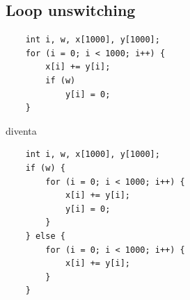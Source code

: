 \documentclass[a4paper, 11pt,            %
openright,               %
italian,
english                 
]{article}       %
\begin{document}
	\subsection{Loop unswitching}
	
	\begin{lstlisting}
	int i, w, x[1000], y[1000];
	for (i = 0; i < 1000; i++) {
		x[i] += y[i];
		if (w)
			y[i] = 0;
	}
	\end{lstlisting}
	
	
	diventa
	
	\begin{lstlisting}
	int i, w, x[1000], y[1000];
	if (w) {
		for (i = 0; i < 1000; i++) {
			x[i] += y[i];
			y[i] = 0;
		}
	} else {
		for (i = 0; i < 1000; i++) {
			x[i] += y[i];
		}
	}
	\end{lstlisting}
	
	
	
	
	
	
	

	
	
	
\end{document}
